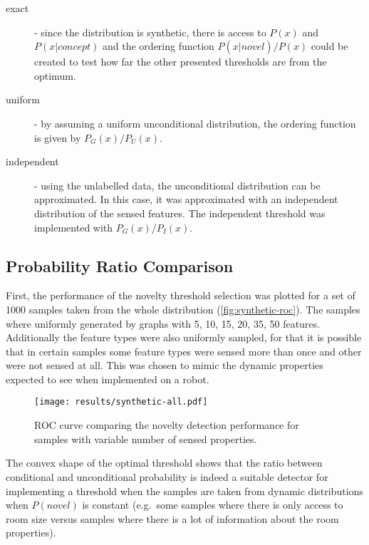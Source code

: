 \begin{description}
\item[exact] 
- since the distribution is synthetic, there is access to $P(x)$ and $P(x|concept)$
and the ordering function $P(x|\overline{novel})/P(x)$ could be created
to test how far the other presented thresholds are from the optimum.

\item[uniform]
- by assuming a uniform unconditional distribution, the ordering function is
  given by $P_G(x)/P_U(x)$.

\item[independent]
- using the unlabelled data, the unconditional distribution can be approximated.
  In this case, it was approximated with an independent distribution of the
  sensed features. The independent threshold was implemented with $P_G(x)/P_I(x)$.
\end{description}


\subsection{Probability Ratio Comparison}
First, the performance of the novelty threshold selection was plotted for a set
of 1000 samples taken from the whole distribution (\autoref{fig:synthetic-roc}).
The samples where uniformly generated by graphs with 5, 10, 15, 20, 35, 50 features.
Additionally the feature types were also uniformly sampled, for that it is possible
that in certain samples some feature types were sensed more than once and other were not
sensed at all.
This was chosen to mimic
the dynamic properties expected to see when implemented on a robot.

\begin{figure}[h]
\centering
\texttt{[image: results/synthetic-all.pdf]}

\caption{\label{fig:synthetic-roc}ROC curve comparing the novelty detection performance
         for samples with variable number of sensed properties.}
\end{figure}

The convex shape of the optimal threshold shows that the ratio between conditional
and unconditional probability is indeed a suitable detector for implementing a threshold when
the samples are taken from dynamic distributions when $P(novel)$ is constant
(e.g.\ some samples where there is only access to room size versus
samples where there is a lot of information about the room properties).

